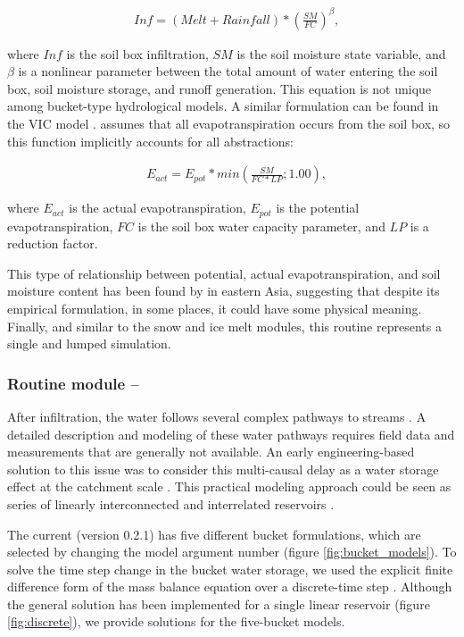 \begin{align}
& Inf = (Melt + Rainfall) * \left( \frac{SM}{FC} \right)^\beta ,
\end{align}

\noindent
where $Inf$ is the soil box infiltration, $SM$ is the soil moisture state variable, and 
$\beta$ is a nonlinear parameter between the total amount of water entering the soil box, soil moisture storage, and runoff
generation. This equation is not unique among bucket-type hydrological models. A similar formulation can be found  in the 
VIC model \citep{liang:1994}.  assumes that all evapotranspiration occurs from the soil box, so this function 
implicitly accounts for all abstractions:

\begin{align}
& E_{act} = E_{pot} * min \left( \frac{SM}{FC * LP}; 1.00 \right) ,
\end{align}

\noindent
where $E_{act}$ is the actual evapotranspiration, $E_{pot}$ is the potential evapotranspiration, $FC$ is the soil box water 
capacity parameter, and $LP$ is a reduction factor. 

This type of relationship between potential, actual evapotranspiration, and soil moisture content has been
found by \citet{zhang:2003} in eastern Asia, suggesting that despite its empirical formulation, in some places, it could
have some physical meaning. Finally, and similar to the snow and ice melt modules, this routine represents a single
and lumped simulation.

\subsubsection{Routine module – }

After infiltration, the water follows several complex pathways to streams \citep{mcdonnell:2003}. A detailed description
and modeling of these water pathways requires field data and measurements that are generally not available. An early 
engineering-based solution to this issue was to consider this multi-causal delay as a water storage effect at the
catchment scale \citep{dooge:1973}. This practical modeling approach could be seen as series of linearly interconnected and
interrelated reservoirs \citep{sivapalan:2017}.

The current  (version 0.2.1) has five different bucket formulations, which are selected by changing the model 
argument number (figure \ref{fig:bucket_models}). To solve the time step change in the bucket water storage,
we used the explicit finite difference form of the mass balance equation over a discrete-time step \citep{beven:2012}.
Although the general solution has been implemented for a single linear reservoir (figure \ref{fig:discrete}), we provide solutions
for the five-bucket models.


